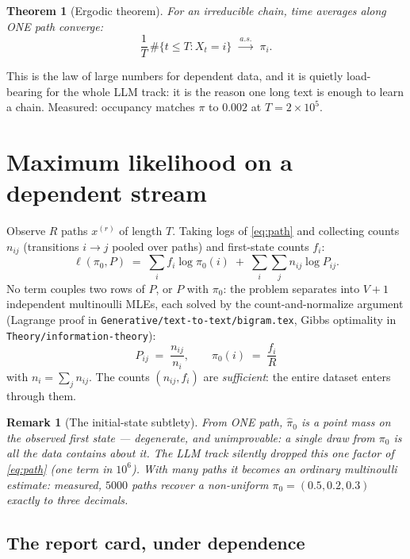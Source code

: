 \documentclass[11pt]{article}
\newtheorem{theorem}{Theorem}
\newtheorem{remark}{Remark}
\begin{document}
\begin{theorem}[Ergodic theorem]
For an irreducible chain, time averages along ONE path converge:
\begin{equation}
  \frac{1}{T}\,\#\{t \le T : X_t = i\} \;\xrightarrow{\ a.s.\ }\;
  \pi_i .
  \label{eq:ergodic}
\end{equation}
\end{theorem}
This is the law of large numbers for dependent data, and it is
quietly load-bearing for the whole LLM track: it is the reason one
long text is enough to learn a chain. Measured: occupancy matches
$\pi$ to $0.002$ at $T = 2\times10^5$.

\section{Maximum likelihood on a dependent stream}

Observe $R$ paths $x^{(r)}$ of length $T$. Taking logs of
\eqref{eq:path} and collecting counts $n_{ij}$ (transitions $i \to j$
pooled over paths) and first-state counts $f_i$:
\begin{equation}
  \ell(\pi_0, P)
  \;=\; \sum_i f_i \log \pi_0(i)
  \;+\; \sum_{i}\sum_{j} n_{ij} \log P_{ij}.
  \label{eq:loglik}
\end{equation}
No term couples two rows of $P$, or $P$ with $\pi_0$: the problem
separates into $V{+}1$ independent multinoulli MLEs, each solved by
the count-and-normalize argument (Lagrange proof in
\texttt{Generative/text-to-text/bigram.tex}, Gibbs optimality in
\texttt{Theory/information-theory}):
\begin{equation}
  \boxed{\;\hat{P}_{ij} \;=\; \frac{n_{ij}}{n_i},
  \qquad
  \hat{\pi}_0(i) \;=\; \frac{f_i}{R}\;}
  \label{eq:mle}
\end{equation}
with $n_i = \sum_j n_{ij}$. The counts $(n_{ij}, f_i)$ are
\emph{sufficient}: the entire dataset enters through them.

\begin{remark}[The initial-state subtlety]
From ONE path, $\hat\pi_0$ is a point mass on the observed first state
--- degenerate, and unimprovable: a single draw from $\pi_0$ is all
the data contains about it. The LLM track silently dropped this one
factor of \eqref{eq:path} (one term in $10^6$). With many paths it
becomes an ordinary multinoulli estimate: measured, $5000$ paths
recover a non-uniform $\pi_0 = (0.5, 0.2, 0.3)$ exactly to three
decimals.
\end{remark}

\subsection{The report card, under dependence}
\end{document}
